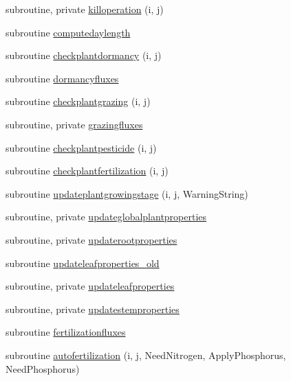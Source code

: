 \begin{DoxyCompactItemize}
\item 
subroutine, private \mbox{\hyperlink{namespacemodulevegetation_a48e334671d44b0f7bf51ba2801d47db0}{killoperation}} (i, j)
\item 
subroutine \mbox{\hyperlink{namespacemodulevegetation_a722712ec8addb85933d86a2bc0fa41aa}{computedaylength}}
\item 
subroutine \mbox{\hyperlink{namespacemodulevegetation_ad6c8bd7bf7ef1c60a031f3752ea5d26d}{checkplantdormancy}} (i, j)
\item 
subroutine \mbox{\hyperlink{namespacemodulevegetation_a62a594d5a2ef5f37a2dcbc4db8507793}{dormancyfluxes}}
\item 
subroutine \mbox{\hyperlink{namespacemodulevegetation_a4db38a1c2ca800ff349c72b3c0c01ce7}{checkplantgrazing}} (i, j)
\item 
subroutine, private \mbox{\hyperlink{namespacemodulevegetation_a6171f7a4fbe04e9636476d638cf27f05}{grazingfluxes}}
\item 
subroutine \mbox{\hyperlink{namespacemodulevegetation_aefcd4003ffaf332e5ccc9b2fabd54149}{checkplantpesticide}} (i, j)
\item 
subroutine \mbox{\hyperlink{namespacemodulevegetation_afa2f07d94b35869067e9a8e4533df2fa}{checkplantfertilization}} (i, j)
\item 
subroutine \mbox{\hyperlink{namespacemodulevegetation_a8f770924e5053c42aa7f57b5a6f5be05}{updateplantgrowingstage}} (i, j, Warning\+String)
\item 
subroutine, private \mbox{\hyperlink{namespacemodulevegetation_ad4d9e32956110026543f678e37dd08e1}{updateglobalplantproperties}}
\item 
subroutine, private \mbox{\hyperlink{namespacemodulevegetation_a508cd23535bbe150f1712dc11c562d65}{updaterootproperties}}
\item 
subroutine \mbox{\hyperlink{namespacemodulevegetation_a61c0b056617116efb1cc8733f0f1fd09}{updateleafproperties\+\_\+old}}
\item 
subroutine, private \mbox{\hyperlink{namespacemodulevegetation_a51955d069f261e54788d0be4185665b4}{updateleafproperties}}
\item 
subroutine, private \mbox{\hyperlink{namespacemodulevegetation_ac544594c050d3fcb7a12971817350194}{updatestemproperties}}
\item 
subroutine \mbox{\hyperlink{namespacemodulevegetation_a045ff1bdd58f618fc041e85a712080d6}{fertilizationfluxes}}
\item 
subroutine \mbox{\hyperlink{namespacemodulevegetation_a75a60d7b15cdc37b7785b839927d2153}{autofertilization}} (i, j, Need\+Nitrogen, Apply\+Phosphorus, Need\+Phosphorus)

\end{DoxyCompactItemize}

